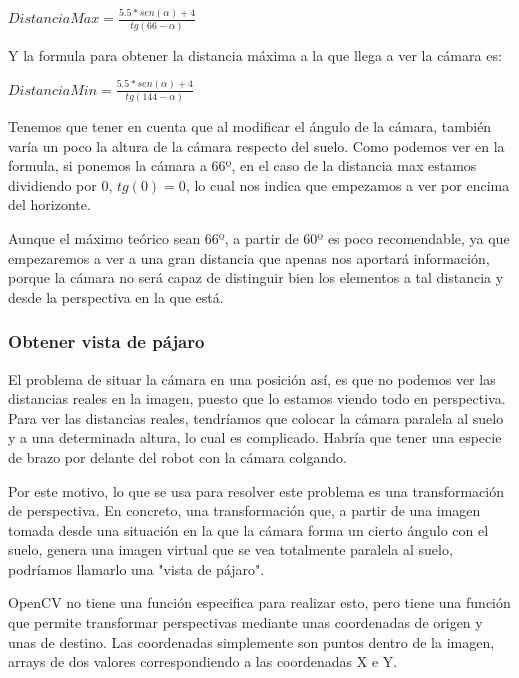 $DistanciaMax = \displaystyle \frac{5.5*sen(\alpha) + 4}{tg(66-\alpha)}$

Y la formula para obtener la distancia máxima a la que llega a ver la cámara es:

$DistanciaMin = \displaystyle \frac{5.5*sen(\alpha) + 4}{tg(144-\alpha)}$

Tenemos que tener en cuenta que al modificar el ángulo de la cámara, también varía un poco la altura de la cámara respecto del suelo.
Como podemos ver en la formula, si ponemos la cámara a 66º, en el caso de la distancia max estamos dividiendo por 0, $tg(0) = 0$, lo cual nos indica que empezamos a ver por encima del horizonte.

Aunque el máximo teórico sean 66º, a partir de 60º es poco recomendable, ya que empezaremos a ver a una gran distancia que apenas nos aportará información, porque la cámara no será capaz de distinguir bien los elementos a tal distancia y desde la perspectiva en la que está.


\subsubsection{Obtener vista de pájaro}

El problema de situar la cámara en una posición así, es que no podemos ver las distancias reales en la imagen, puesto que lo estamos viendo todo en perspectiva. Para ver las distancias reales, tendríamos que colocar la cámara paralela al suelo y a una determinada altura, lo cual es complicado. Habría que tener una especie de brazo por delante del robot con la cámara colgando.

Por este motivo, lo que se usa para resolver este problema es una transformación de perspectiva\cite{trans_p}. En concreto, una transformación que, a partir de una imagen tomada desde una situación en la que la cámara forma un cierto ángulo con el suelo, genera una imagen virtual que se vea totalmente paralela al suelo, podríamos llamarlo una "vista de pájaro"\cite{bird}.


OpenCV no tiene una función especifica para realizar esto, pero tiene una función que permite transformar perspectivas mediante unas coordenadas de origen y unas de destino\cite{persp_trans}. Las coordenadas simplemente son puntos dentro de la imagen, arrays de dos valores correspondiendo a las coordenadas X e Y.


